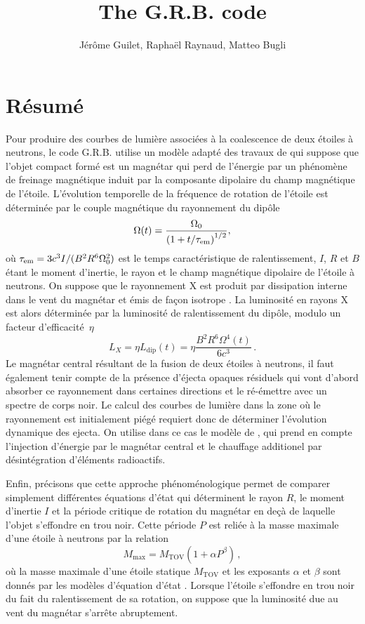 \documentclass[11pt]{article} %
\title{The G.R.B. code}
\author{J\'er\^ome Guilet, Rapha\"el Raynaud, Matteo Bugli}
\newcommand{\tx}[1]{\textrm{#1}}
\newcommand{\Ldip}{\ensuremath{L_\tx{dip}}}
\begin{document}
\maketitle

\section{Résumé}
Pour produire des courbes de lumière associées à la coalescence de
deux étoiles à neutrons, le code G.R.B.  utilise un modèle adapté des
travaux de \citet{sun2017} qui suppose que l'objet compact formé est
un magnétar qui perd de l'énergie par un phénomène de freinage
magnétique induit par la composante dipolaire du champ magnétique de
l'étoile. L'évolution temporelle de la fréquence de rotation de
l'étoile est déterminée par le couple magnétique du rayonnement du
dipôle
\begin{equation}
\Omega(t) = \frac{\Omega_0}{\left(1 + t/\tau_{\rm em}\right)^{1/2}},
\end{equation}
où $\tau_{\rm em} = 3c^3 I/(B^2 R^6 \Omega_0^2) $ est le temps
caractéristique de ralentissement, $I$, $R$ et $B$ étant le moment
d'inertie, le rayon et le champ magnétique dipolaire de l'étoile à
neutrons. On suppose que le rayonnement X est produit par dissipation
interne dans le vent du magnétar et émis de façon isotrope
\citep{zhang2013}. La luminosité en rayons X est alors déterminée par
la luminosité de ralentissement du dipôle, modulo un facteur
d'efficacité~$\eta$
\begin{equation}
  L_X = \eta \Ldip(t) = \eta \frac{B^2 R^6 \Omega^4(t)}{6 c^3}
  \,.
\end{equation}
Le magnétar central résultant de la fusion de deux étoiles à neutrons,
il faut également tenir compte de la présence d'éjecta opaques
résiduels qui vont d'abord absorber ce rayonnement dans certaines
directions et le ré-émettre avec un spectre de corps noir. Le calcul
des courbes de lumière dans la zone où le rayonnement est initialement
piégé requiert donc de déterminer l'évolution dynamique des ejecta. On
utilise dans ce cas le modèle de \citet{yu2013}, qui prend en compte
l'injection d'énergie par le magnétar central et le chauffage
additionel par désintégration d'éléments radioactifs.

Enfin, précisons que cette approche phénoménologique permet de
comparer simplement différentes équations d'état qui déterminent le
rayon $R$, le moment d'inertie $I$ et la période critique de rotation
du magnétar en deçà de laquelle l'objet s'effondre en trou noir. Cette
période $P$ est reliée à la masse maximale d'une étoile à neutrons par
la relation \citep{lasky2014}
\begin{equation}
  M_\tx{max} = M_\tx{TOV} (1+ \alpha P^\beta)
  \,,
\end{equation}
où la masse maximale d'une étoile statique $M_\text{TOV}$ et les
exposants $\alpha$ et $\beta$ sont donnés par les modèles d'équation
d'état \citep{ai2018}. Lorsque l'étoile s'effondre en trou noir du
fait du ralentissement de sa rotation, on suppose que la luminosité
due au vent du magnétar s'arrête abruptement.
\end{document}
